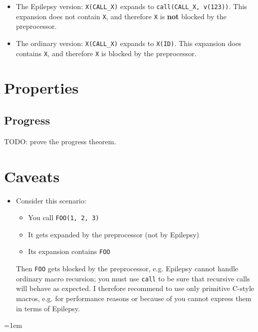 \documentclass[12pt]{article}
\theoremstyle{break}
\begin{document}
\begin{itemize}
    \item The Epilepsy version: \texttt{X(CALL\_X)} expands to \texttt{call(CALL\_X, v(123))}.
    This expansion does not contain \texttt{X}, and therefore \texttt{X} is \textbf{not}
    blocked by the preprocessor.

    \item The ordinary version: \texttt{X(CALL\_X)} expands to \texttt{X(ID)}. This expansion
    does contains \texttt{X}, and therefore \texttt{X} is blocked by the preprocessor.
\end{itemize}

\section{Properties}

\subsection{Progress}

TODO: prove the progress theorem.

\section{Caveats}

\begin{itemize}
\item Consider this scenario:
    \begin{itemize}
        \item You call \texttt{FOO(1, 2, 3)}
        \item It gets expanded by the preprocessor (not by Epilepsy)
        \item Its expansion contains \texttt{FOO}
    \end{itemize}
Then \texttt{FOO} gets blocked by the preprocessor, e.g. Epilepsy cannot handle ordinary
macro recursion; you must use \texttt{call} to be sure that recursive calls
will behave as expected. I therefore recommend to use only primitive C-style macros, e.g.
for performance reasons or because of you cannot express them in terms of Epilepsy.
\end{itemize}

\emergencystretch=1em
\printbibliography
\end{document}
